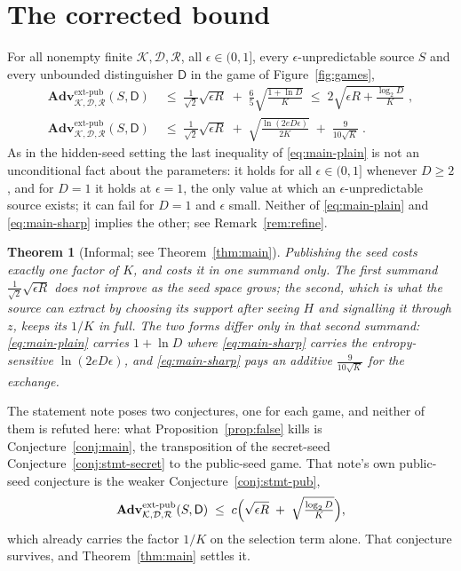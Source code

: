 \documentclass{conjura-solution}
\newcommand{\Adv}{\mathbf{Adv}}
\newcommand{\extp}{\mathrm{ext}\text{-}\mathrm{pub}}
\newcommand{\calK}{\mathcal{K}}
\newcommand{\calD}{\mathcal{D}}
\newcommand{\calR}{\mathcal{R}}
\newtheorem*{theoremstar}{Theorem}
\begin{document}
\section{The corrected bound}\label{sec:corrected}

\begin{theorem}\label{thm:main}
For all nonempty finite $\calK, \calD, \calR$, all $\epsilon \in (0,1]$, every $\epsilon$-unpredictable
source $S$ and every unbounded distinguisher $\mathsf{D}$ in the game of Figure~\ref{fig:games},
\begin{align}
  \Adv^{\extp}_{\calK,\calD,\calR}(S,\mathsf{D})
  &\;\le\; \frac{1}{\sqrt{2}}\sqrt{\epsilon R}
        \;+\; \frac{6}{5}\sqrt{\frac{1 + \ln D}{K}}
  \;\le\; 2\sqrt{\epsilon R + \frac{\log_2 D}{K}} \; ,
  \label{eq:main-plain}\\[2pt]
  \Adv^{\extp}_{\calK,\calD,\calR}(S,\mathsf{D})
  &\;\le\; \frac{1}{\sqrt{2}}\sqrt{\epsilon R}
        \;+\; \sqrt{\frac{\ln(2eD\epsilon)}{2K}} \;+\; \frac{9}{10\sqrt{K}} \; .
  \label{eq:main-sharp}
\end{align}
As in the hidden-seed setting the last inequality of \eqref{eq:main-plain} is not an unconditional
fact about the parameters: it holds for all $\epsilon \in (0,1]$ whenever $D \ge 2$, and for
$D = 1$ it holds at $\epsilon = 1$, the only value at which an $\epsilon$-unpredictable source
exists; it can fail for $D = 1$ and $\epsilon$ small. Neither of
\eqref{eq:main-plain} and \eqref{eq:main-sharp} implies the other; see Remark~\ref{rem:refine}.
\end{theorem}

\begin{theoremstar}[Informal; see Theorem~\ref{thm:main}]
Publishing the seed costs exactly one factor of $K$, and costs it in one summand only. The first
summand $\tfrac{1}{\sqrt{2}}\sqrt{\epsilon R}$ does not improve as the seed space grows; the
second, which is what the source can extract by choosing its support after seeing $H$ and signalling
it through $z$, keeps its $1/K$ in full. The two forms differ only in that second summand:
\eqref{eq:main-plain} carries $1 + \ln D$ where \eqref{eq:main-sharp} carries the
entropy-sensitive $\ln(2eD\epsilon)$, and \eqref{eq:main-sharp} pays an additive
$\tfrac{9}{10\sqrt{K}}$ for the exchange.
\end{theoremstar}

The statement note poses two conjectures, one for each game, and neither of them is refuted here:
what Proposition~\ref{prop:false} kills is Conjecture~\ref{conj:main}, the transposition of the
secret-seed Conjecture~\ref{conj:stmt-secret} to the public-seed game. That note's own
public-seed conjecture is the weaker Conjecture~\ref{conj:stmt-pub},
\begin{equation}\label{eq:pubconj}
  \Adv^{\extp}_{\calK,\calD,\calR}(S,\mathsf{D})
  \;\le\; c\Bigl(\sqrt{\epsilon R} \;+\; \sqrt{\tfrac{\log_2 D}{K}}\Bigr) ,
\end{equation}
which already carries the factor $1/K$ on the selection term alone. That conjecture survives, and
Theorem~\ref{thm:main} settles it.
\end{document}

